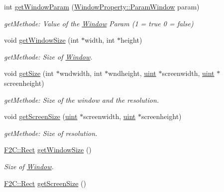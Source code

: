 \begin{DoxyCompactItemize}
int \hyperlink{class_f2_c_1_1_window_add95e367e862fa5b4e71892920204bc3}{getWindowParam} (\hyperlink{namespace_f2_c_1_1_window_property_a89ec69d0a86f9d0063dfb69a3ebf3fbe}{WindowProperty::ParamWindow} param)
\begin{DoxyCompactList}\small\item\em getMethode: Value of the \hyperlink{class_f2_c_1_1_window}{Window} Param (1 = true 0 = false) \item\end{DoxyCompactList}\item 
void \hyperlink{class_f2_c_1_1_window_ad522ef19b23fc5e75a3194c8edbf618d}{getWindowSize} (int $\ast$width, int $\ast$height)
\begin{DoxyCompactList}\small\item\em getMethode: Size of \hyperlink{class_f2_c_1_1_window}{Window}. \item\end{DoxyCompactList}\item 
void \hyperlink{class_f2_c_1_1_window_a907540c263f7a326ca72e498f36aaddd}{getSize} (int $\ast$wndwidth, int $\ast$wndheight, \hyperlink{namespace_f2_c_a58be2bac9eb3e3c99cb41b6008bf4fae}{uint} $\ast$screenwidth, \hyperlink{namespace_f2_c_a58be2bac9eb3e3c99cb41b6008bf4fae}{uint} $\ast$screenheight)
\begin{DoxyCompactList}\small\item\em getMethode: Size of the window and the resolution. \item\end{DoxyCompactList}\item 
void \hyperlink{class_f2_c_1_1_window_a89e19f862d823bd9d9093022f5ebe314}{getScreenSize} (\hyperlink{namespace_f2_c_a58be2bac9eb3e3c99cb41b6008bf4fae}{uint} $\ast$screenwidth, \hyperlink{namespace_f2_c_a58be2bac9eb3e3c99cb41b6008bf4fae}{uint} $\ast$screenheight)
\begin{DoxyCompactList}\small\item\em getMethode: Size of resolution. \item\end{DoxyCompactList}\item 
\hypertarget{class_f2_c_1_1_window_a5ed986e5a4f368863008ff56f8b67660}{
\hyperlink{class_f2_c_1_1_rect}{F2C::Rect} \hyperlink{class_f2_c_1_1_window_a5ed986e5a4f368863008ff56f8b67660}{getWindowSize} ()}
\label{class_f2_c_1_1_window_a5ed986e5a4f368863008ff56f8b67660}

\begin{DoxyCompactList}\small\item\em Size of \hyperlink{class_f2_c_1_1_window}{Window}. \item\end{DoxyCompactList}\item 
\hypertarget{class_f2_c_1_1_window_a6db49cb8843581aa1d5cbd50255d7d65}{
\hyperlink{class_f2_c_1_1_rect}{F2C::Rect} \hyperlink{class_f2_c_1_1_window_a6db49cb8843581aa1d5cbd50255d7d65}{getScreenSize} ()}
\label{class_f2_c_1_1_window_a6db49cb8843581aa1d5cbd50255d7d65}


\end{DoxyCompactItemize}
